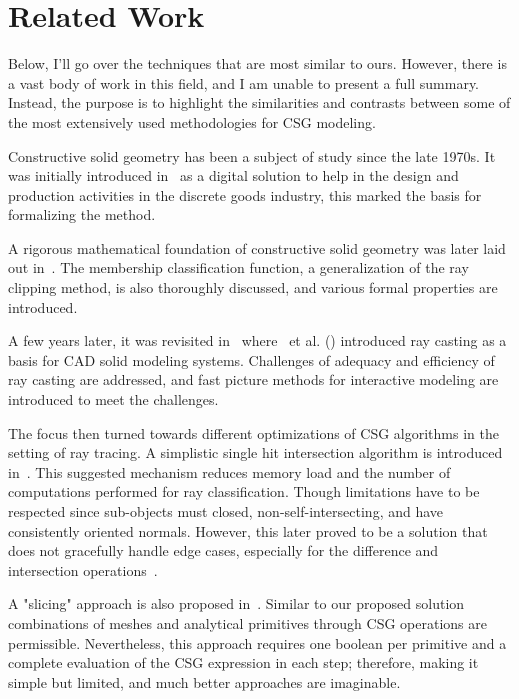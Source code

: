 \documentclass[a4paper,11pt,oneside]{article}
\begin{document}
  
\section{Related Work}
  
Below, I'll go over the techniques that are most similar to ours. However, there is a vast body of work in this field, and I am unable to present a full summary. Instead, the purpose is to highlight the similarities and contrasts between some of the most extensively used methodologies for CSG modeling.

Constructive solid geometry has been a subject of study since the late 1970s. It was initially introduced in~\cite{GEOMETRIC_MODELING_1977} as a digital solution to help in the design and production activities in the discrete goods industry, this marked the basis for formalizing the method.
  
A rigorous mathematical foundation of constructive solid geometry was later laid out in~\cite{Requicha1978MathematicalFO}. The membership classification function, a generalization of the ray clipping method, is also thoroughly discussed, and various formal properties are introduced.
  
A few years later, it was revisited in~\cite{ROTH1982109} where~\citeauthor{ROTH1982109} et al. (\citeyear{ROTH1982109}) introduced ray casting as a basis for CAD solid modeling systems. Challenges of adequacy and efficiency of ray casting are addressed, and fast picture methods for interactive modeling are introduced to meet the challenges.
  
The focus then turned towards different optimizations of CSG algorithms in the setting of ray tracing. A simplistic single hit intersection algorithm is introduced in~\cite{kensler_ray_2006}. This suggested mechanism reduces memory load and the number of computations performed for ray classification. Though limitations have to be respected since sub-objects must closed, non-self-intersecting, and have consistently oriented normals. However, this later proved to be a solution that does not gracefully handle edge cases, especially for the difference and intersection operations~\cite{csg-xrt-renderer}.
  
A "slicing" approach is also proposed in~\cite{lefebvre:hal-00926861}. Similar to our proposed solution combinations of meshes and analytical primitives through CSG operations are permissible. Nevertheless, this approach requires one boolean per primitive and a complete evaluation of the CSG expression in each step; therefore, making it simple but limited, and much better approaches are imaginable.
\end{document}
